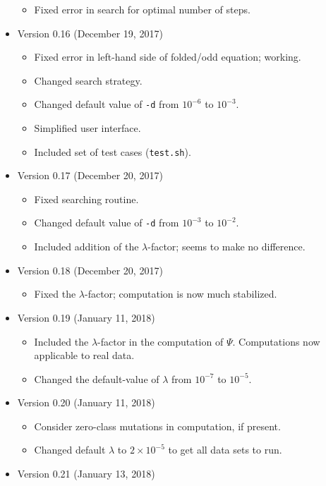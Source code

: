 \documentclass[a4paper]{article}
\newcommand{\ty}{\texttt}
\begin{document}
\begin{itemize}
\begin{itemize}
  \item Fixed error in search for optimal number of steps.
  \end{itemize}
\item Version 0.16 (December 19, 2017)
  \begin{itemize}
  \item Fixed error in left-hand side of folded/odd equation; working.
  \item Changed search strategy.
  \item Changed default value of \ty{-d} from $10^{-6}$ to $10^{-3}$.
  \item Simplified user interface.
  \item Included set of test cases (\ty{test.sh}).
  \end{itemize}
  \item Version 0.17 (December 20, 2017)
  \begin{itemize}
  \item Fixed searching routine.
  \item Changed default value of \ty{-d} from $10^{-3}$ to $10^{-2}$.
  \item Included addition of the $\lambda$-factor; seems to make no difference.
  \end{itemize}
\item Version 0.18 (December 20, 2017)
  \begin{itemize}
  \item Fixed the $\lambda$-factor; computation is now much
    stabilized.
  \end{itemize}
\item Version 0.19 (January 11, 2018)
  \begin{itemize}
  \item Included the $\lambda$-factor in the computation of
    $\Psi$. Computations now applicable to real data.
  \item Changed the default-value of $\lambda$ from $10^{-7}$ to $10^{-5}$.
  \end{itemize}
\item Version 0.20 (January 11, 2018)
  \begin{itemize}
  \item Consider zero-class mutations in computation, if present.
  \item Changed default $\lambda$ to $2\times 10^{-5}$ to get all data
    sets to run.
  \end{itemize}
\item Version 0.21 (January 13, 2018)
  \begin{itemize}

\end{itemize}
\end{itemize}
\end{document}

